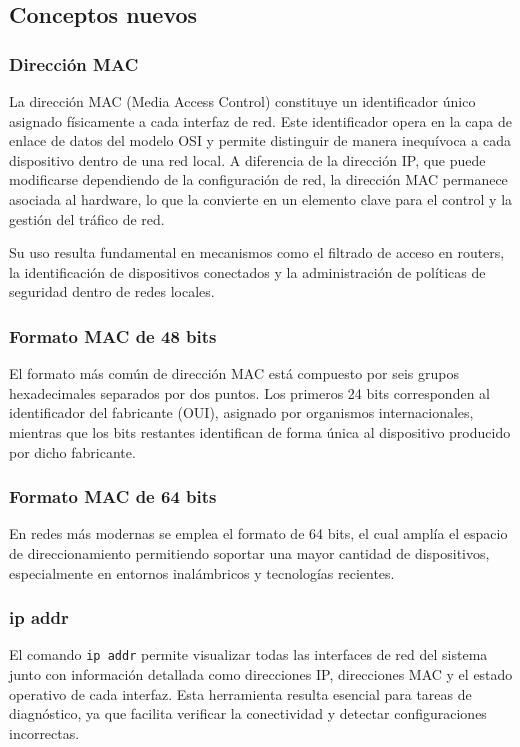 \documentclass[11pt, letterpaper]{article}
\begin{document}
\subsection{Conceptos nuevos}
\label{sec:orgff1fe63}

\subsubsection{Dirección MAC}
\label{sec:orgb263953}

La dirección MAC (Media Access Control) constituye un identificador
único asignado físicamente a cada interfaz de red. Este identificador
opera en la capa de enlace de datos del modelo OSI y permite distinguir
de manera inequívoca a cada dispositivo dentro de una red local. A
diferencia de la dirección IP, que puede modificarse dependiendo de la
configuración de red, la dirección MAC permanece asociada al hardware,
lo que la convierte en un elemento clave para el control y la gestión
del tráfico de red.

Su uso resulta fundamental en mecanismos como el filtrado de acceso en
routers, la identificación de dispositivos conectados y la
administración de políticas de seguridad dentro de redes locales.
\subsubsection{Formato MAC de 48 bits}
\label{sec:org1916b99}

El formato más común de dirección MAC está compuesto por seis grupos
hexadecimales separados por dos puntos. Los primeros 24 bits corresponden
al identificador del fabricante (OUI), asignado por organismos
internacionales, mientras que los bits restantes identifican de forma
única al dispositivo producido por dicho fabricante.
\subsubsection{Formato MAC de 64 bits}
\label{sec:orgb18c4f5}

En redes más modernas se emplea el formato de 64 bits, el cual amplía
el espacio de direccionamiento permitiendo soportar una mayor cantidad
de dispositivos, especialmente en entornos inalámbricos y tecnologías
recientes.
\subsubsection{ip addr}
\label{sec:orge8c074c}

El comando \texttt{ip addr} permite visualizar todas las interfaces de red del
sistema junto con información detallada como direcciones IP,
direcciones MAC y el estado operativo de cada interfaz. Esta
herramienta resulta esencial para tareas de diagnóstico, ya que
facilita verificar la conectividad y detectar configuraciones
incorrectas.
\end{document}
